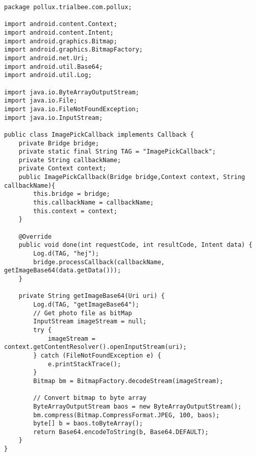 \begin{lstlisting}
package pollux.trialbee.com.pollux;

import android.content.Context;
import android.content.Intent;
import android.graphics.Bitmap;
import android.graphics.BitmapFactory;
import android.net.Uri;
import android.util.Base64;
import android.util.Log;

import java.io.ByteArrayOutputStream;
import java.io.File;
import java.io.FileNotFoundException;
import java.io.InputStream;

public class ImagePickCallback implements Callback {
    private Bridge bridge;
    private static final String TAG = "ImagePickCallback";
    private String callbackName;
    private Context context;
    public ImagePickCallback(Bridge bridge,Context context, String callbackName){
        this.bridge = bridge;
        this.callbackName = callbackName;
        this.context = context;
    }

    @Override
    public void done(int requestCode, int resultCode, Intent data) {
        Log.d(TAG, "hej");
        bridge.processCallback(callbackName, getImageBase64(data.getData()));
    }

    private String getImageBase64(Uri uri) {
        Log.d(TAG, "getImageBase64");
        // Get photo file as bitMap
        InputStream imageStream = null;
        try {
            imageStream = context.getContentResolver().openInputStream(uri);
        } catch (FileNotFoundException e) {
            e.printStackTrace();
        }
        Bitmap bm = BitmapFactory.decodeStream(imageStream);

        // Convert bitmap to byte array
        ByteArrayOutputStream baos = new ByteArrayOutputStream();
        bm.compress(Bitmap.CompressFormat.JPEG, 100, baos);
        byte[] b = baos.toByteArray();
        return Base64.encodeToString(b, Base64.DEFAULT);
    }
}
\end{lstlisting}

